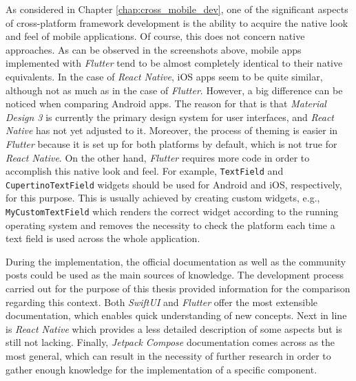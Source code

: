As considered in Chapter \ref{chap:cross_mobile_dev}, one of the significant aspects of cross-platform framework development is the ability to acquire the native look and feel of mobile applications. Of course, this does not concern native approaches. As can be observed in the screenshots above, mobile apps implemented with \emph{Flutter} tend to be almost completely identical to their native equivalents. In the case of \emph{React Native}, iOS apps seem to be quite similar, although not as much as in the case of \emph{Flutter}. However, a big difference can be noticed when comparing Android apps. The reason for that is that \emph{Material Design 3} is currently the primary design system for user interfaces, and \emph{React Native} has not yet adjusted to it. Moreover, the process of theming is easier in \emph{Flutter} because it is set up for both platforms by default, which is not true for \emph{React Native}. On the other hand, \emph{Flutter} requires more code in order to accomplish this native look and feel. For example, \texttt{TextField} and \texttt{CupertinoTextField} widgets should be used for Android and iOS, respectively, for this purpose. This is usually achieved by creating custom widgets, e.g., \texttt{MyCustomTextField} which renders the correct widget according to the running operating system and removes the necessity to check the platform each time a text field is used across the whole application.

During the implementation, the official documentation as well as the community posts could be used as the main sources of knowledge. The development process carried out for the purpose of this thesis provided information for the comparison regarding this context. Both \emph{SwiftUI} and \emph{Flutter} offer the most extensible documentation, which enables quick understanding of new concepts. Next in line is \emph{React Native} which provides a less detailed description of some aspects but is still not lacking. Finally, \emph{Jetpack Compose} documentation comes across as the most general, which can result in the necessity of further research in order to gather enough knowledge for the implementation of a specific component.

\clearpage
